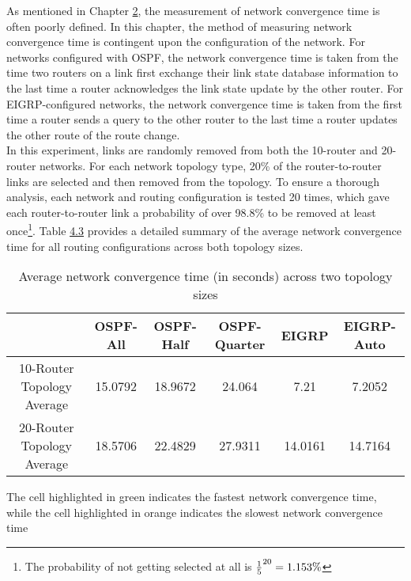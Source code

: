 \documentclass{uiucthesis2021}
\begin{document}
\noindent As mentioned in Chapter \hyperref[c2]{2}, the measurement of network convergence time is often poorly defined. In this chapter, the method of measuring network convergence time is contingent upon the configuration of the network. For networks configured with OSPF, the network convergence time is taken from the time two routers on a link first exchange their link state database information to the last time a router acknowledges the link state update by the other router. For EIGRP-configured networks, the network convergence time is taken from the first time a router sends a query to the other router to the last time a router updates the other route of the route change. \\ 

\noindent In this experiment, links are randomly removed from both the 10-router and 20-router networks. For each network topology type, 20\% of the router-to-router links are selected and then removed from the topology. To ensure a thorough analysis, each network and routing configuration is tested 20 times, which gave each router-to-router link a probability of over 98.8\% to be removed at least once\footnote{The probability of not getting selected at all is ${1 \over 5}^{20} = 1.153\%$}. Table \hyperref[t43]{4.3} provides a detailed summary of the average network convergence time for all routing configurations across both topology sizes.\\

\label{t43}
\begin{table}[!h]
\begin{center}
\begin{tabular}{|c||c|c|c|c|c|} 
 \hline
  & OSPF-All & OSPF-Half & OSPF-Quarter & EIGRP & EIGRP-Auto \\
 \hline\hline
10-Router Topology Average & 15.0792 & 18.9672 & \cellcolor{orange!25}24.064 & 7.21 & \cellcolor{green!25}7.2052 \\
\hline
20-Router Topology Average & 18.5706 & 22.4829 & \cellcolor{orange!25}27.9311 & \cellcolor{green!25}14.0161 & 14.7164 \\
\hline
\end{tabular}
\caption{Average network convergence time (in seconds) across two topology sizes}
The cell highlighted in green indicates the fastest network convergence time, while the cell highlighted in orange
indicates the slowest network convergence time
\end{center}
\end{table}
\end{document}
